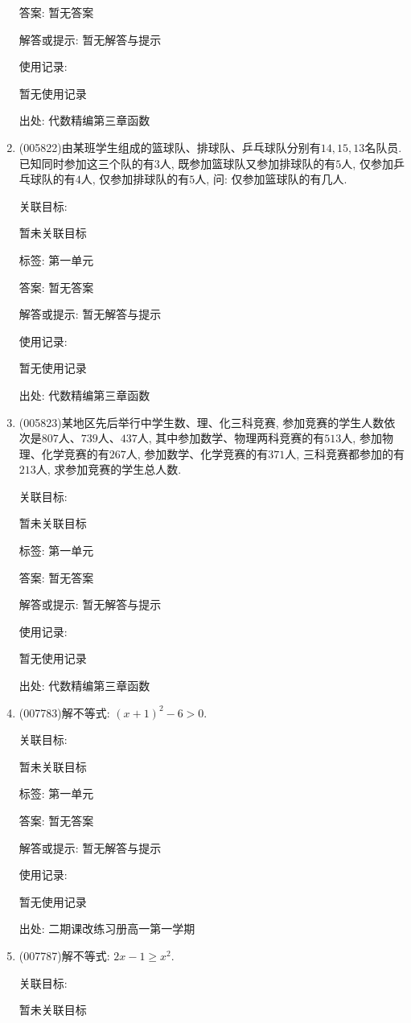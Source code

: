 \documentclass[10pt,a4paper]{article}
\begin{document}
\begin{enumerate}[1.]
答案: 暂无答案

解答或提示: 暂无解答与提示

使用记录:

暂无使用记录


出处: 代数精编第三章函数
\item { (005822)}由某班学生组成的篮球队、排球队、乒乓球队分别有$14, 15, 13$名队员.已知同时参加这三个队的有$3$人, 既参加篮球队又参加排球队的有$5$人, 仅参加乒乓球队的有$4$人, 仅参加排球队的有$5$人, 问: 仅参加篮球队的有几人.


关联目标:

暂未关联目标



标签: 第一单元

答案: 暂无答案

解答或提示: 暂无解答与提示

使用记录:

暂无使用记录


出处: 代数精编第三章函数
\item { (005823)}某地区先后举行中学生数、理、化三科竞赛, 参加竞赛的学生人数依次是$807$人、$739$人、$437$人, 其中参加数学、物理两科竞赛的有$513$人, 参加物理、化学竞赛的有$267$人, 参加数学、化学竞赛的有$371$人, 三科竞赛都参加的有$213$人, 求参加竞赛的学生总人数.


关联目标:

暂未关联目标



标签: 第一单元

答案: 暂无答案

解答或提示: 暂无解答与提示

使用记录:

暂无使用记录


出处: 代数精编第三章函数
\item { (007783)}解不等式: $(x+1)^2-6>0$.


关联目标:

暂未关联目标



标签: 第一单元

答案: 暂无答案

解答或提示: 暂无解答与提示

使用记录:

暂无使用记录


出处: 二期课改练习册高一第一学期
\item { (007787)}解不等式: $2x-1\ge x^2$.


关联目标:

暂未关联目标




\end{enumerate}
\end{document}
